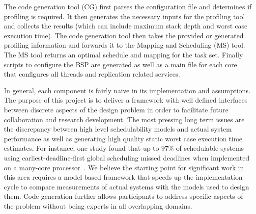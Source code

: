 	The code generation tool (CG) first parses the configuration file and determines if profiling is required. 
	It then generates the necessary inputs for the profiling tool and collects the results (which can include maximum stack depth and worst case execution time). 
	The code generation tool then takes the provided or generated profiling information and forwards it to the Mapping and Scheduling (MS) tool. 
	The MS tool returns an optimal schedule and mapping for the task set. 
	Finally scripts to configure the BSP are generated as well as a main file for each core that configures all threads and replication related services. 	
	
	
	
	In general, each component is fairly naive in its implementation and assumptions. 
	The purpose of this project is to deliver a framework with well defined interfaces between discrete aspects of the design problem in order to facilitate future collaboration and research development. 
	The most pressing long term issues are the discrepancy between high level schedulability models and actual system performance as well as generating high quality static worst case execution time estimates.
	For instance, one study found that up to 97\% of schedulable systems using earliest-deadline-first global scheduling missed deadlines when implemented on a many-core processor~\cite{sigrist2015mixed}.
	We believe the starting point for significant work in this area requires a model based framework that speeds up the implementation cycle to compare measurements of actual systems with the models used to design them.
	Code generation further allows participants to address specific aspects of the problem without being experts in all overlapping domains.

